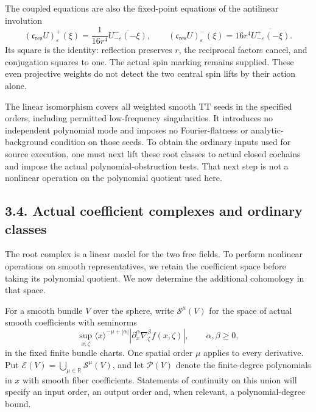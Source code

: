 \documentclass[
  english,
  11pt,
  reqno]{amsart}
\begin{document}
The coupled equations are also the fixed-point equations of the
antilinear involution \[
(\mathfrak c_{\mathrm{res}}U)^+_\varepsilon(\xi)
=\frac1{16r^4}\overline{U^-_{-\varepsilon}(-\xi)},
\qquad
(\mathfrak c_{\mathrm{res}}U)^-_\varepsilon(\xi)
=16r^4\overline{U^+_{-\varepsilon}(-\xi)}.
\] Its square is the identity: reflection preserves \(r\), the
reciprocal factors cancel, and conjugation squares to one. The actual
spin marking remains supplied. These even projective weights do not
detect the two central spin lifts by their action alone.

The linear isomorphism covers all weighted smooth TT seeds in the
specified orders, including permitted low-frequency singularities. It
introduces no independent polynomial mode and imposes no
Fourier-flatness or analytic-background condition on those seeds. To
obtain the ordinary inputs used for source execution, one must next lift
these root classes to actual closed cochains and impose the actual
polynomial-obstruction tests. That next step is not a nonlinear
operation on the polynomial quotient used here.

\subsection{3.4. Actual coefficient complexes and ordinary
classes}\label{actual-coefficient-complexes-and-ordinary-classes}\label{sec:online-actual-coefficient-complexes}

The root complex is a linear model for the two free fields. To perform
nonlinear operations on smooth representatives, we retain the
coefficient space before taking its polynomial quotient. We now
determine the additional cohomology in that space.

For a smooth bundle \(V\) over the sphere, write \(\mathscr S^\mu(V)\)
for the space of actual smooth coefficients with seminorms%
 \[
\sup_{x,\zeta}\langle x\rangle^{-\mu+|\alpha|}
\left|\partial_x^\alpha\nabla_\zeta^\beta f(x,\zeta)\right|,
\qquad \alpha,\beta\ge0,
\] in the fixed finite bundle charts. One spatial order \(\mu\) applies
to every derivative. Put
\(\mathscr E(V)=\bigcup_{\mu\in\mathbb R}\mathscr S^\mu(V)\), and let
\(\mathscr P(V)\) denote the finite-degree polynomials in \(x\) with
smooth fiber coefficients. Statements of continuity on this union will
specify an input order, an output order and, when relevant, a
polynomial-degree bound.
\end{document}
